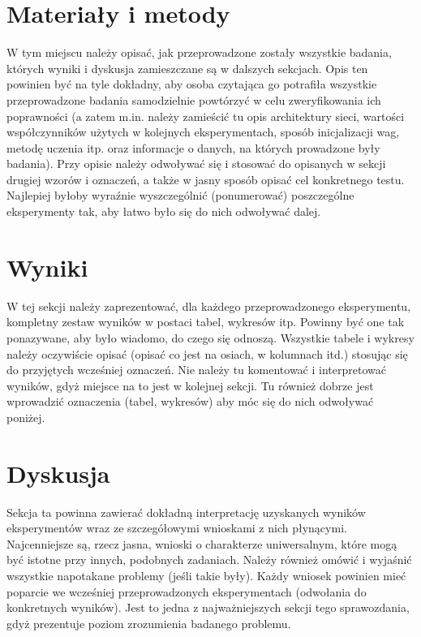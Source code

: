 \documentclass{classrep}
\begin{document}
	\section{Materiały i metody}
	{\color{blue}
		W tym miejscu należy opisać, jak przeprowadzone zostały wszystkie badania,
		których wyniki i dyskusja zamieszczane są w dalszych sekcjach. Opis ten
		powinien być na tyle dokładny, aby osoba czytająca go potrafiła wszystkie
		przeprowadzone badania samodzielnie powtórzyć w celu zweryfikowania ich
		poprawności (a zatem m.in. należy zamieścić tu opis architektury sieci,
		wartości współczynników użytych w kolejnych eksperymentach, sposób
		inicjalizacji wag, metodę uczenia itp. oraz informacje o danych, na których
		prowadzone były badania). Przy opisie należy odwoływać się i stosować do
		opisanych w sekcji drugiej wzorów i oznaczeń, a także w jasny sposób opisać
		cel konkretnego testu. Najlepiej byłoby wyraźnie wyszczególnić (ponumerować)
		poszczególne eksperymenty tak, aby łatwo było się do nich odwoływać dalej.}
	
	\section{Wyniki}
	{\color{blue}
		W tej sekcji należy zaprezentować, dla każdego przeprowadzonego eksperymentu,
		kompletny zestaw wyników w postaci tabel, wykresów itp. Powinny być one tak
		ponazywane, aby było wiadomo, do czego się odnoszą. Wszystkie tabele i wykresy
		należy oczywiście opisać (opisać co jest na osiach, w kolumnach itd.) stosując
		się do przyjętych wcześniej oznaczeń. Nie należy tu komentować i interpretować
		wyników, gdyż miejsce na to jest w kolejnej sekcji. Tu również dobrze jest
		wprowadzić oznaczenia (tabel, wykresów) aby móc się do nich odwoływać
		poniżej.}
	
	\section{Dyskusja}
	{\color{blue}
		Sekcja ta powinna zawierać dokładną interpretację uzyskanych wyników
		eksperymentów wraz ze szczegółowymi wnioskami z nich płynącymi. Najcenniejsze
		są, rzecz jasna, wnioski o charakterze uniwersalnym, które mogą być istotne
		przy innych, podobnych zadaniach. Należy również omówić i wyjaśnić wszystkie
		napotakane problemy (jeśli takie były). Każdy wniosek powinien mieć poparcie
		we wcześniej przeprowadzonych eksperymentach (odwołania do konkretnych
		wyników). Jest to jedna z najważniejszych sekcji tego sprawozdania, gdyż
		prezentuje poziom zrozumienia badanego problemu.}
\end{document}

